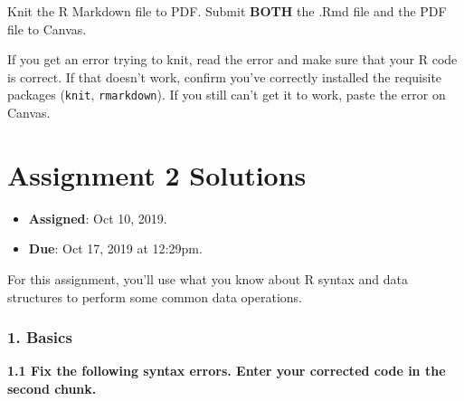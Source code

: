 \documentclass[]{book}
\providecommand{\tightlist}{%
  \setlength{\itemsep}{0pt}\setlength{\parskip}{0pt}}
\begin{document}
Knit the R Markdown file to PDF. Submit \textbf{BOTH} the .Rmd file and the PDF file to Canvas.

If you get an error trying to knit, read the error and make sure that your R code is correct. If that doesn't work, confirm you've correctly installed the requisite packages (\texttt{knit}, \texttt{rmarkdown}). If you still can't get it to work, paste the error on Canvas.

\hypertarget{assignment-2-solutions}{%
\section{Assignment 2 Solutions}\label{assignment-2-solutions}}

\begin{itemize}
\tightlist
\item
  \textbf{Assigned}: Oct 10, 2019.
\item
  \textbf{Due}: Oct 17, 2019 at 12:29pm.
\end{itemize}

For this assignment, you'll use what you know about R syntax and data structures to perform some common data operations.

\hypertarget{basics}{%
\subsubsection*{1. Basics}\label{basics}}

\textbf{1.1 Fix the following syntax errors. Enter your corrected code in the second chunk.}
\end{document}

